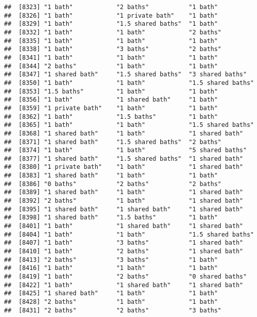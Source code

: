 \documentclass[
]{article}
\begin{document}
\begin{verbatim}
##  [8323] "1 bath"            "2 baths"           "1 bath"           
##  [8326] "1 bath"            "1 private bath"    "1 bath"           
##  [8329] "1 bath"            "1.5 shared baths"  "1 bath"           
##  [8332] "1 bath"            "1 bath"            "2 baths"          
##  [8335] "1 bath"            "1 bath"            "1 bath"           
##  [8338] "1 bath"            "3 baths"           "2 baths"          
##  [8341] "1 bath"            "1 bath"            "1 bath"           
##  [8344] "2 baths"           "1 bath"            "1 bath"           
##  [8347] "1 shared bath"     "1.5 shared baths"  "3 shared baths"   
##  [8350] "1 bath"            "1 bath"            "1.5 shared baths" 
##  [8353] "1.5 baths"         "1 bath"            "1 bath"           
##  [8356] "1 bath"            "1 shared bath"     "1 bath"           
##  [8359] "1 private bath"    "1 bath"            "1 bath"           
##  [8362] "1 bath"            "1.5 baths"         "1 bath"           
##  [8365] "1 bath"            "1 bath"            "1.5 shared baths" 
##  [8368] "1 shared bath"     "1 bath"            "1 shared bath"    
##  [8371] "1 shared bath"     "1.5 shared baths"  "2 baths"          
##  [8374] "1 bath"            "1 bath"            "5 shared baths"   
##  [8377] "1 shared bath"     "1.5 shared baths"  "1 shared bath"    
##  [8380] "1 private bath"    "1 bath"            "1 shared bath"    
##  [8383] "1 shared bath"     "1 bath"            "1 bath"           
##  [8386] "0 baths"           "2 baths"           "2 baths"          
##  [8389] "1 shared bath"     "1 bath"            "1 shared bath"    
##  [8392] "2 baths"           "1 bath"            "1 shared bath"    
##  [8395] "1 shared bath"     "1 shared bath"     "1 shared bath"    
##  [8398] "1 shared bath"     "1.5 baths"         "1 bath"           
##  [8401] "1 bath"            "1 shared bath"     "1 shared bath"    
##  [8404] "1 bath"            "1 bath"            "1.5 shared baths" 
##  [8407] "1 bath"            "3 baths"           "1 shared bath"    
##  [8410] "1 bath"            "2 baths"           "1 shared bath"    
##  [8413] "2 baths"           "3 baths"           "1 bath"           
##  [8416] "1 bath"            "1 bath"            "1 bath"           
##  [8419] "1 bath"            "2 baths"           "0 shared baths"   
##  [8422] "1 bath"            "1 shared bath"     "1 shared bath"    
##  [8425] "1 shared bath"     "1 bath"            "1 bath"           
##  [8428] "2 baths"           "1 bath"            "1 bath"           
##  [8431] "2 baths"           "2 baths"           "3 baths"          

\end{verbatim}
\end{document}
